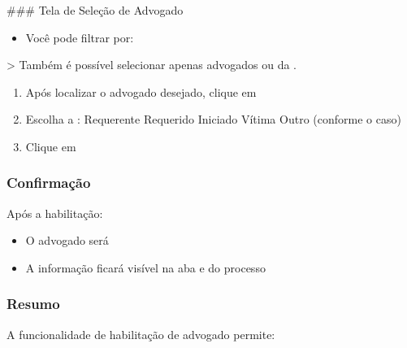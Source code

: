 \documentclass[letterpaper,10pt,brazil]{sphinxmanual}
\begin{document}
\sphinxAtStartPar
\#\#\# Tela de Seleção de Advogado
\begin{itemize}
\item {} 
\sphinxAtStartPar
Você pode filtrar por:
\sphinxhyphen{} 
\sphinxhyphen{} 

\end{itemize}

\sphinxAtStartPar
\textgreater{} Também é possível selecionar apenas advogados  ou da .
\begin{enumerate}
%
\setcounter{enumi}{3}
\item {} 
\sphinxAtStartPar
Após localizar o advogado desejado, clique em 

\item {} 
\sphinxAtStartPar
Escolha a :
\sphinxhyphen{} Requerente
\sphinxhyphen{} Requerido
\sphinxhyphen{} Iniciado
\sphinxhyphen{} Vítima
\sphinxhyphen{} Outro (conforme o caso)

\item {} 
\sphinxAtStartPar
Clique em 

\end{enumerate}


\subsubsection{Confirmação}
\label{\detokenize{projud_26_habilitaradvogado:confirmacao}}
\sphinxAtStartPar
Após a habilitação:
\begin{itemize}
\item {} 
\sphinxAtStartPar
O advogado será 

\item {} 
\sphinxAtStartPar
A informação ficará visível na aba  e  do processo

\end{itemize}


\subsubsection{Resumo}
\label{\detokenize{projud_26_habilitaradvogado:resumo}}
\sphinxAtStartPar
A funcionalidade de habilitação de advogado permite:
\end{document}
